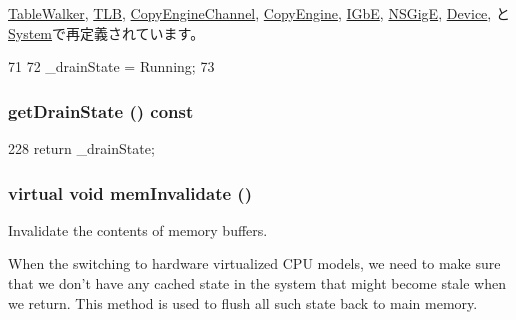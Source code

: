 \hyperlink{classArmISA_1_1TableWalker_a8f020d3237536fe007fc488c4125c5d8}{TableWalker}, \hyperlink{classArmISA_1_1TLB_a8f020d3237536fe007fc488c4125c5d8}{TLB}, \hyperlink{classCopyEngine_1_1CopyEngineChannel_a8f020d3237536fe007fc488c4125c5d8}{CopyEngineChannel}, \hyperlink{classCopyEngine_a8f020d3237536fe007fc488c4125c5d8}{CopyEngine}, \hyperlink{classIGbE_a8f020d3237536fe007fc488c4125c5d8}{IGbE}, \hyperlink{classNSGigE_a8f020d3237536fe007fc488c4125c5d8}{NSGigE}, \hyperlink{classSinic_1_1Device_a8f020d3237536fe007fc488c4125c5d8}{Device}, と \hyperlink{classSystem_a8f020d3237536fe007fc488c4125c5d8}{System}で再定義されています。


\begin{DoxyCode}
71 {
72     _drainState = Running;
73 }
\end{DoxyCode}
\hypertarget{classDrainable_a5c95358f0e9355bcc3979baf3fb7307f}{
\subsubsection[{getDrainState}]{ getDrainState () const}}
\label{classDrainable_a5c95358f0e9355bcc3979baf3fb7307f}



\begin{DoxyCode}
228 { return _drainState; }
\end{DoxyCode}
\hypertarget{classDrainable_a7f243f736712f56d8dd50cd21c77b9d1}{
\subsubsection[{memInvalidate}]{\setlength{\rightskip}{0pt plus 5cm}virtual void memInvalidate ()}}
\label{classDrainable_a7f243f736712f56d8dd50cd21c77b9d1}
Invalidate the contents of memory buffers.

When the switching to hardware virtualized CPU models, we need to make sure that we don't have any cached state in the system that might become stale when we return. This method is used to flush all such state back to main memory.

